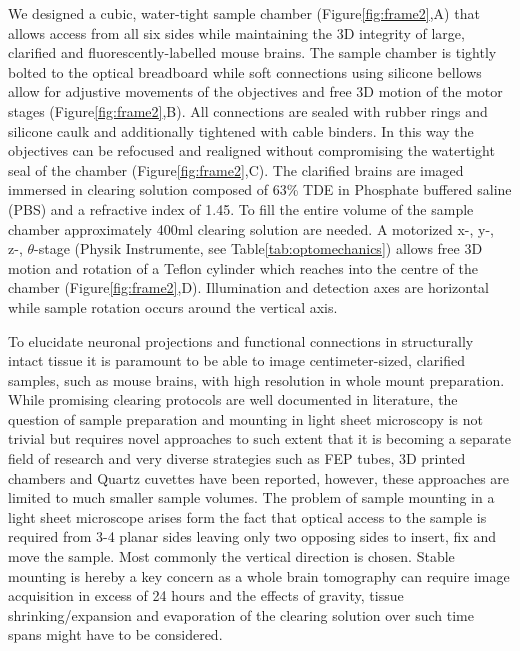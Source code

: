 \documentclass[12pt]{spieman}  %
\begin{document}
We designed a cubic, water-tight sample chamber (Figure\ref{fig:frame2},A) that allows access from all six sides while maintaining the 3D integrity of large, clarified and fluorescently-labelled mouse brains. The sample chamber is tightly bolted  to the optical breadboard while soft connections using silicone bellows allow for adjustive movements of the objectives and free 3D motion of the motor stages (Figure\ref{fig:frame2},B). All connections are sealed with rubber rings and silicone caulk and additionally tightened with cable binders. In this way the objectives can be refocused and realigned without compromising the watertight seal of the chamber (Figure\ref{fig:frame2},C). The clarified brains are imaged immersed in clearing solution composed of 63\% TDE in Phosphate buffered saline (PBS) and a refractive index of 1.45. To fill the entire volume of the sample chamber approximately 400ml clearing solution are needed. A motorized x-, y-, z-, $\theta$-stage (Physik Instrumente, see Table\ref{tab:optomechanics}) allows free 3D motion and rotation of a Teflon cylinder which reaches into the centre of the chamber (Figure\ref{fig:frame2},D). Illumination and detection axes are horizontal while sample rotation occurs around the vertical axis.		
		
To elucidate neuronal projections and functional connections in structurally intact tissue it is paramount to be able to image centimeter-sized, clarified samples, such as mouse brains, with high resolution in whole mount preparation. While promising clearing protocols are well documented in literature\cite{Chung2013,Tomer2014}, the question of sample preparation and mounting in light sheet microscopy is not trivial but requires novel approaches to such extent that it is becoming a separate field of research and very diverse strategies such as FEP tubes, 3D printed chambers and Quartz cuvettes have been reported\cite{Kaufmann2012,Pitrone2013,Olarte2012,Tomer2014}, however, these approaches are limited to much smaller sample volumes. The problem of sample mounting in a light sheet microscope arises form the fact that optical access to the sample is required from 3-4 planar sides leaving only two opposing sides to insert, fix and move the sample. Most commonly the vertical direction is chosen. Stable mounting is hereby a key concern as a whole brain tomography can require image acquisition in excess of 24 hours and the effects of gravity, tissue shrinking/expansion and evaporation of the clearing solution over such time spans might have to be considered. 
\end{document}

